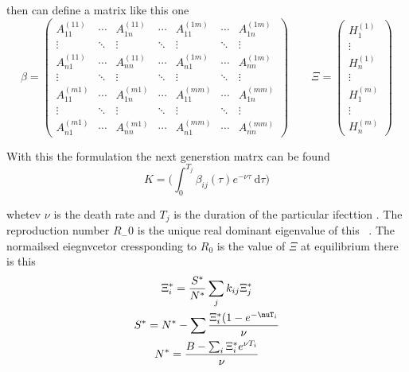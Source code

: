 \documentclass[DIV=15]{scrartcl}
\begin{document}
then can define a matrix like this one
 \begin{equation}
\beta = \begin{pmatrix}
A_{11}^{(11)}& \cdots & A_{1n}^{(11)} & \cdots & A_{11}^{(1m)} & \cdots & A_{1n}^{(1m)} \\
\vdots & \ddots & \vdots & \ddots & \vdots & \ddots & \vdots \\ 
 A_{n1}^{(11)}& \cdots & A_{nn}^{(11)} & \cdots & A_{n1}^{(1m)} & \cdots & A_{nn}^{(1m)} \\
\vdots & \ddots & \vdots & \ddots & \vdots & \ddots & \vdots \\  
A_{11}^{(m1)}& \cdots & A_{1n}^{(m1)} & \cdots & A_{11}^{(mm)} & \cdots & A_{1n}^{(mm)} \\
\vdots & \ddots & \vdots & \ddots & \vdots & \ddots & \vdots \\ 
 A_{n1}^{(m1)}& \cdots & A_{nn}^{(m1)} & \cdots & A_{n1}^{(mm)} & \cdots & A_{nn}^{(mm)}
\end{pmatrix} \qquad
\Xi =\begin{pmatrix} H_{1}^{(1)}\\ \vdots \\ H_n^{(1)} \\ \vdots \\ H_1^{(m)}  \\ \vdots \\ H_n^{(m)} \end{pmatrix} 
\label{gamma}
\end{equation}


With this the formulation the next generstion  matrx  can be found 
  \begin{equation}
   K = \bigg( \int_0^{T_j}\beta_{ij}(\tau) e^{-\nu \tau} \ \text{d} \tau \bigg)
  \end{equation}

whetev 
$\nu$ is the death rate and $T_j$ is the duration of the particular ifecttion   .   The reproduction  number $R_-0$ is the unique real dominant eigenvalue of this~\cite{diekmann1990,diekmann2013} . The  normailsed eiegnvcetor  cressponding to  $R_0$ is the value of $ \Xi$ at equilibrium
  there is this 
 \begin{gather}
 \Xi_i^*  = \frac{S^*}{N^*} \sum_j k_{ij}\Xi_j^* \\
 S^* =  N^* - \sum \frac{\Xi_i^*(1-e^{-\nuT_i}}{\nu}\\
 N^* = \frac{B-\sum_i \Xi_i^* e^{\nu T_i}}{\nu}
 \end{gather}
 
 
 
\end{document}
